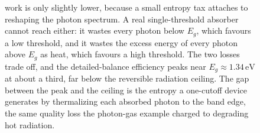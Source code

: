 \begin{figure}[htbp]
{work is only slightly lower, because a small entropy tax attaches to reshaping the
photon spectrum. A real single-threshold absorber cannot reach either: it wastes
every photon below $E_g$, which favours a low threshold, and it wastes the excess
energy of every photon above $E_g$ as heat, which favours a high threshold. The
two losses trade off, and the detailed-balance efficiency peaks near
$E_g\approx1.34\,\si{\electronvolt}$ at about a third, far below the reversible
radiation ceiling. The gap between the peak and the ceiling is the entropy a
one-cutoff device generates by thermalizing each absorbed photon to the band edge,
the same quality loss the photon-gas example charged to degrading hot radiation.}
\label{fig:vol04ch04:solar-cell-limit}
\end{figure}

